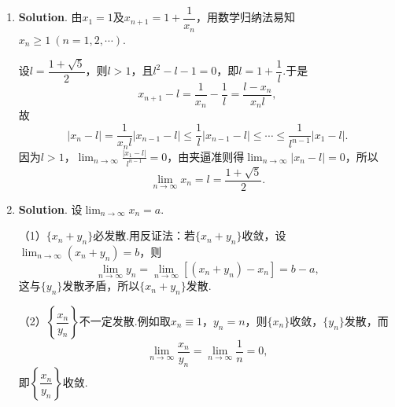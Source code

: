 \documentclass[../main.tex]{subfiles}
\begin{document}
\begin{enumerate}
          漏斗中水的体积与桶中水的体积分别为
          \[
              V_{1}=\frac{1}{3}\pi r^{2}h=\frac{\pi h^{3}}{48},\qquad V_{2}=\pi\cdot6^{2}\cdot H=36\pi H.
          \]
          两式两边关于$t$求导，得
          \[
              \frac{\mathrm{d}V_{1}}{\mathrm{d}t}=\frac{\pi h^{2}}{16}\frac{\mathrm{d}h}{\mathrm{d}t},\qquad
              \frac{\mathrm{d}V_{2}}{\mathrm{d}t}=36\pi\frac{\mathrm{d}H}{\mathrm{d}t}.
          \]
          因为漏斗中减少的水全部流入桶内，所以$\dfrac{\mathrm{d}V_{2}}{\mathrm{d}t}=-\dfrac{\mathrm{d}V_{1}}{\mathrm{d}t}$.

          当$h=16\mathrm{cm}$，$\dfrac{\mathrm{d}h}{\mathrm{d}t}=-2\mathrm{cm/s}$时，
          \[
              \frac{\mathrm{d}V_{1}}{\mathrm{d}t}=\frac{\pi\cdot16^{2}}{16}\times(-2)=-32\pi,
          \]
          于是
          \[
              \frac{\mathrm{d}H}{\mathrm{d}t}=\frac{1}{36\pi}\cdot32\pi=\frac{8}{9}.
          \]
          即此时桶中水面上升的速度为$\dfrac{8}{9}\mathrm{cm/s}$.

    \item \textbf{Solution}. 由$x_{1}=1$及$x_{n+1}=1+\dfrac{1}{x_{n}}$，用数学归纳法易知$x_{n}\geq1\ (n=1,2,\cdots)$.

          设$l=\dfrac{1+\sqrt{5}}{2}$，则$l>1$，且$l^{2}-l-1=0$，即$l=1+\dfrac{1}{l}$.于是
          \[
              x_{n+1}-l=\frac{1}{x_{n}}-\frac{1}{l}=\frac{l-x_{n}}{x_{n}l},
          \]
          故
          \[
              \left|x_{n}-l\right|=\frac{1}{x_{n}l}\left|x_{n-1}-l\right|\leq\frac{1}{l}\left|x_{n-1}-l\right|
              \leq\cdots\leq\frac{1}{l^{n-1}}\left|x_{1}-l\right|.
          \]
          因为$l>1$，$\lim_{n\to\infty}\frac{\left|x_{1}-l\right|}{l^{n-1}}=0$，由夹逼准则得$\lim_{n\to\infty}\left|x_{n}-l\right|=0$，所以
          \[
              \lim_{n\to\infty}x_{n}=l=\frac{1+\sqrt{5}}{2}.
          \]

    \item \textbf{Solution}. 设$\lim_{n\to\infty}x_{n}=a$.

          （1）$\{x_{n}+y_{n}\}$必发散.用反证法：若$\{x_{n}+y_{n}\}$收敛，设$\lim_{n\to\infty}\left(x_{n}+y_{n}\right)=b$，则
          \[
              \lim_{n\to\infty}y_{n}=\lim_{n\to\infty}\left[\left(x_{n}+y_{n}\right)-x_{n}\right]=b-a,
          \]
          这与$\{y_{n}\}$发散矛盾，所以$\{x_{n}+y_{n}\}$发散.

          （2）$\left\{\dfrac{x_{n}}{y_{n}}\right\}$不一定发散.例如取$x_{n}\equiv1$，$y_{n}=n$，则$\{x_{n}\}$收敛，$\{y_{n}\}$发散，而
          \[
              \lim_{n\to\infty}\frac{x_{n}}{y_{n}}=\lim_{n\to\infty}\frac{1}{n}=0,
          \]
          即$\left\{\dfrac{x_{n}}{y_{n}}\right\}$收敛.
\end{enumerate}
\end{document}
